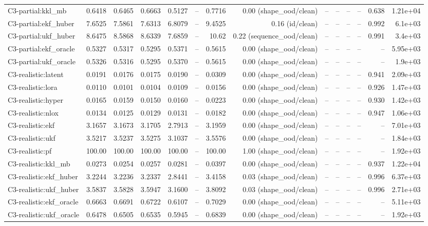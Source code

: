 \begin{table}[t]
\begin{tabular}{lrrrrrrrrrrrrr}
C3-partial:kkl\_mb & 0.6418 & 0.6465 & 0.6663 & 0.5127 & – & 0.7716 & 0.00 (shape\_ood/clean) & – & – & – & – & 0.638 & 1.21e+04 \\
C3-partial:ekf\_huber & 7.6525 & 7.5861 & 7.6313 & 6.8079 & – & 9.4525 & 0.16 (id/clean) & – & – & – & – & 0.992 & 6.1e+03 \\
C3-partial:ukf\_huber & 8.6475 & 8.5868 & 8.6339 & 7.6859 & – & 10.62 & 0.22 (sequence\_ood/clean) & – & – & – & – & 0.991 & 3.4e+03 \\
C3-partial:ekf\_oracle & 0.5327 & 0.5317 & 0.5295 & 0.5371 & – & 0.5615 & 0.00 (shape\_ood/clean) & – & – & – & – & – & 5.95e+03 \\
C3-partial:ukf\_oracle & 0.5326 & 0.5316 & 0.5295 & 0.5370 & – & 0.5615 & 0.00 (shape\_ood/clean) & – & – & – & – & – & 1.9e+03 \\
C3-realistic:latent & 0.0191 & 0.0176 & 0.0175 & 0.0190 & – & 0.0309 & 0.00 (shape\_ood/clean) & – & – & – & – & 0.941 & 2.09e+03 \\
C3-realistic:lora & 0.0110 & 0.0101 & 0.0104 & 0.0109 & – & 0.0156 & 0.00 (shape\_ood/clean) & – & – & – & – & 0.926 & 1.47e+03 \\
C3-realistic:hyper & 0.0165 & 0.0159 & 0.0150 & 0.0160 & – & 0.0223 & 0.00 (shape\_ood/clean) & – & – & – & – & 0.930 & 1.42e+03 \\
C3-realistic:nlox & 0.0134 & 0.0125 & 0.0129 & 0.0131 & – & 0.0182 & 0.00 (shape\_ood/clean) & – & – & – & – & 0.947 & 1.06e+03 \\
C3-realistic:ekf & 3.1657 & 3.1673 & 3.1705 & 2.7913 & – & 3.1959 & 0.00 (shape\_ood/clean) & – & – & – & – & – & 7.01e+03 \\
C3-realistic:ukf & 3.5217 & 3.5237 & 3.5275 & 3.1037 & – & 3.5576 & 0.00 (shape\_ood/clean) & – & – & – & – & – & 1.84e+03 \\
C3-realistic:pf & 100.00 & 100.00 & 100.00 & 100.00 & – & 100.00 & 1.00 (shape\_ood/clean) & – & – & – & – & – & 1.92e+03 \\
C3-realistic:kkl\_mb & 0.0273 & 0.0254 & 0.0257 & 0.0281 & – & 0.0397 & 0.00 (shape\_ood/clean) & – & – & – & – & 0.937 & 1.22e+04 \\
C3-realistic:ekf\_huber & 3.2244 & 3.2236 & 3.2337 & 2.8441 & – & 3.4158 & 0.03 (shape\_ood/clean) & – & – & – & – & 0.996 & 6.37e+03 \\
C3-realistic:ukf\_huber & 3.5837 & 3.5828 & 3.5947 & 3.1600 & – & 3.8092 & 0.03 (shape\_ood/clean) & – & – & – & – & 0.996 & 2.71e+03 \\
C3-realistic:ekf\_oracle & 0.6663 & 0.6691 & 0.6722 & 0.6107 & – & 0.7029 & 0.00 (shape\_ood/clean) & – & – & – & – & – & 5.11e+03 \\
C3-realistic:ukf\_oracle & 0.6478 & 0.6505 & 0.6535 & 0.5945 & – & 0.6839 & 0.00 (shape\_ood/clean) & – & – & – & – & – & 1.92e+03 \\
\bottomrule
\end{tabular}
\end{table}

